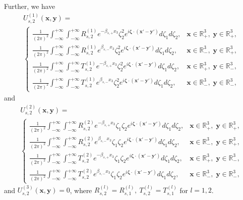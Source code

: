 \documentclass[final,reqno]{siamltex}
\newcommand{\mat}{\mathbb}
\newcommand{\R}{{\mat R}}
\begin{document}
Further, we have 
\begin{align*}
&U_{s,2}^{(1)}(\mathbf{x},\mathbf{y})=\\
&\left\{
\begin{array}{ll}
	\displaystyle\frac{1}{(2\pi)^2}\int_{-\infty}^{+\infty}\int_{-\infty}^{+\infty}R_{s,2}^{(1)}e^{-\beta_{s,+}x_3}\zeta_2^2e^{i\boldsymbol{\zeta}\cdot(\mathbf{x}'-\mathbf{y}')}d\zeta_1d\zeta_2,&\mathbf{x}\in\R^3_+,\;\mathbf{y}\in\R^3_+,\\
	\displaystyle\frac{1}{(2\pi)^2}\int_{-\infty}^{+\infty}\int_{-\infty}^{+\infty}R_{s,2}^{(1)}e^{\beta_{s,-}x_3}\zeta_2^2e^{i\boldsymbol{\zeta}\cdot(\mathbf{x}'-\mathbf{y}')}d\zeta_1d\zeta_2,&\mathbf{x}\in\R^3_-,\;\mathbf{y}\in\R^3_+, \\
	\displaystyle\frac{1}{(2\pi)^2}\int_{-\infty}^{+\infty}\int_{-\infty}^{+\infty}T_{s,2}^{(1)}e^{-\beta_{s,+}x_3}\zeta_2^2e^{i\boldsymbol{\zeta}\cdot(\mathbf{x}'-\mathbf{y}')}d\zeta_1d\zeta_2,&\mathbf{x}\in\R^3_+,\;\mathbf{y}\in\R^3_-, \\
	\displaystyle\frac{1}{(2\pi)^2}\int_{-\infty}^{+\infty}\int_{-\infty}^{+\infty}T_{s,2}^{(1)}e^{\beta_{s,-}x_3}\zeta_2^2e^{i\boldsymbol{\zeta}\cdot(\mathbf{x}'-\mathbf{y}')}d\zeta_1d\zeta_2,&\mathbf{x}\in\R^3_-,\;\mathbf{y}\in\R^3_-, 
\end{array}
\right.
\end{align*}
and 
\begin{align*}
&U_{s,2}^{(2)}(\mathbf{x},\mathbf{y})=\\
&\left\{
\begin{array}{ll}
	\displaystyle\frac{1}{(2\pi)^2}\int_{-\infty}^{+\infty}\int_{-\infty}^{+\infty}R_{s,2}^{(2)}e^{-\beta_{s,+}x_3}\zeta_1\zeta_2e^{i\boldsymbol{\zeta}\cdot(\mathbf{x}'-\mathbf{y}')}d\zeta_1d\zeta_2,&\mathbf{x}\in\R^3_+,\;\mathbf{y}\in\R^3_+,\\
	\displaystyle\frac{1}{(2\pi)^2}\int_{-\infty}^{+\infty}\int_{-\infty}^{+\infty}R_{s,2}^{(2)}e^{\beta_{s,-}x_3}\zeta_1\zeta_2e^{i\boldsymbol{\zeta}\cdot(\mathbf{x}'-\mathbf{y}')}d\zeta_1d\zeta_2,&\mathbf{x}\in\R^3_-,\;\mathbf{y}\in\R^3_+, \\
	\displaystyle\frac{1}{(2\pi)^2}\int_{-\infty}^{+\infty}\int_{-\infty}^{+\infty}T_{s,2}^{(2)}e^{-\beta_{s,+}x_3}\zeta_1\zeta_2e^{i\boldsymbol{\zeta}\cdot(\mathbf{x}'-\mathbf{y}')}d\zeta_1d\zeta_2,&\mathbf{x}\in\R^3_+,\;\mathbf{y}\in\R^3_-, \\
	\displaystyle\frac{1}{(2\pi)^2}\int_{-\infty}^{+\infty}\int_{-\infty}^{+\infty}T_{s,2}^{(2)}e^{\beta_{s,-}x_3}\zeta_1\zeta_2e^{i\boldsymbol{\zeta}\cdot(\mathbf{x}'-\mathbf{y}')}d\zeta_1d\zeta_2,&\mathbf{x}\in\R^3_-,\;\mathbf{y}\in\R^3_-, 
\end{array}
\right.
\end{align*}
and $U_{s,2}^{(3)}(\mathbf{x},\mathbf{y})=0$, where 
$
  R_{s,2}^{(l)}=R_{s,1}^{(l)},~T_{s,2}^{(l)}=T_{s,1}^{(l)} 
$
for $l=1,2$. 
\end{document}
